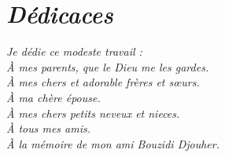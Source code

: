 \thispagestyle{plain}
\chapter*{\textit{Dédicaces}}

\begin{center}
    

\vspace*{2cm}
\textit{Je dédie ce modeste travail :}\\
\textit{À mes parents,  que le Dieu me les gardes.}\\[3pc]
\textit{À mes chers et adorable frères et sœurs.}\\
\textit{À ma chère épouse.}\\
\textit{À mes chers petits neveux et nieces.}\\
\textit{À tous mes amis.}\\
\textit{À la mémoire de mon ami Bouzidi Djouher.}\\[3pc]



\end{center}